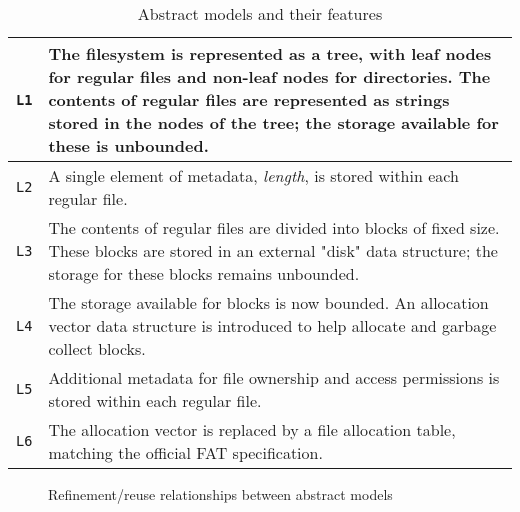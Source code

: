 \documentclass[submission,copyright,creativecommons]{eptcs}
\begin{document}
\begin{table}[]
  \centering
  \caption{Abstract models and their features}
  \label{abstract-model-description-table}
  \begin{tabular}{|l|p{120mm}|}
    \hline
    \texttt{L1} & The filesystem is represented as a tree, with leaf
    nodes for regular files and non-leaf nodes for
    directories. The contents of regular files are represented as
    strings stored in the nodes of the tree; the storage available for
    these is unbounded. \\ \hline
    \texttt{L2} & A single element of metadata, \textit{length}, is
    stored within each regular file.  \\ \hline
    \texttt{L3} & The contents of regular files are divided into
    blocks of fixed size. These blocks are stored in an external
    "disk" data structure; the storage for these blocks remains
    unbounded. \\ \hline
    \texttt{L4} & The storage available for blocks is now bounded. An
    allocation vector data structure is introduced to help allocate
    and garbage collect blocks. \\ \hline
    \texttt{L5} & Additional metadata for file ownership and access
    permissions is stored within each regular file. \\ \hline
    \texttt{L6} & The allocation vector is replaced by a file
    allocation table, matching the official FAT specification. \\ \hline
  \end{tabular}
\end{table}

\begin{figure}
  \centering
  \caption{Refinement/reuse relationships between abstract models}
  \label{refinement-figure}
\end{figure}
\end{document}
